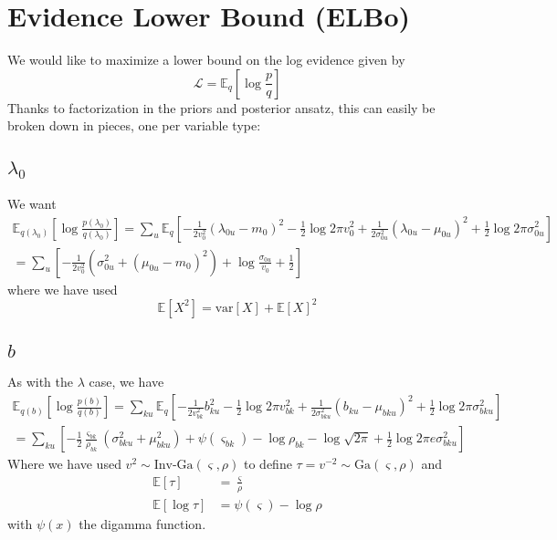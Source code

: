 \documentclass[11pt]{article}
\begin{document}
\section{Evidence Lower Bound (ELBo)}
We would like to maximize a lower bound on the log evidence given by
\begin{equation}
    \mathcal{L} = \mathbb{E}_q \left[ \log \frac{p}{q} \right]
\end{equation}
Thanks to factorization in the priors and posterior ansatz, this can easily be broken down in pieces, one per variable type:

\subsection{$\lambda_0$}
We want 
\begin{multline}
    \mathbb{E}_{q(\lambda_0)}\left[ \log \frac{p(\lambda_0)}{q(\lambda_0)}\right] = \sum_u \mathbb{E}_q\left[ -\frac{1}{2v_0^2} (\lambda_{0u} - m_0)^2
    - \frac{1}{2}\log 2\pi v_0^2
    + \frac{1}{2\sigma_{0u}^2} (\lambda_{0u} - \mu_{0u})^2
    + \frac{1}{2}\log 2\pi \sigma^2_{0u}
    \right] \\
    = \sum_u \left[
    -\frac{1}{2v_0^2} \left(\sigma^2_{0u} + (\mu_{0u} - m_0)^2 \right)
    + \log \frac{\sigma_{0u}}{v_0} + \frac{1}{2}
    \right] 
\end{multline}
where we have used 
\begin{equation}
    \mathbb{E}[X^2] = \mathrm{var}[X] + \mathbb{E}[X]^2
\end{equation}

\subsection{$b$}
As with the $\lambda$ case, we have 
\begin{multline}
    \mathbb{E}_{q(b)}\left[ \log \frac{p(b)}{q(b)}\right] = \sum_{ku} \mathbb{E}_q\left[ -\frac{1}{2v_{bk}^2} b_{ku}^2
    - \frac{1}{2}\log 2\pi v_{bk}^2
    + \frac{1}{2\sigma_{bku}^2} (b_{ku} - \mu_{bku})^2
    + \frac{1}{2}\log 2\pi \sigma^2_{bku} 
    \right] \\
    = \sum_{ku} \left[
    -\frac{1}{2}\frac{\varsigma_{bk}}{\rho_{bk}}\left(\sigma^2_{bku} + \mu^2_{bku} \right)
    + \psi(\varsigma_{bk}) - \log \rho_{bk} - \log \sqrt{2\pi} + \frac{1}{2} \log 2\pi e \sigma^2_{bku}
    \right]
\end{multline}
Where we have used $v^2 \sim \text{Inv-Ga}(\varsigma, \rho)$ to define $\tau = v^{-2} \sim \mathrm{Ga}(\varsigma, \rho)$ and 
\begin{align}
    \mathbb{E}[\tau] &= \frac{\varsigma}{\rho} \\
    \mathbb{E}[\log \tau] &= \psi(\varsigma) - \log \rho
\end{align}
with $\psi(x)$ the digamma function.
\end{document}
